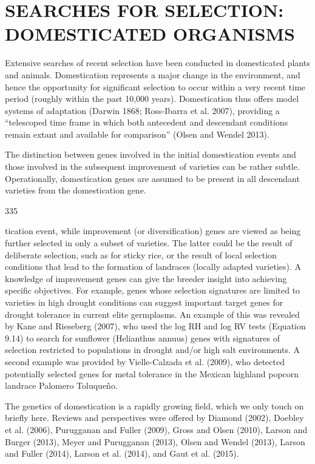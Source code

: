 \documentclass{article}
\begin{document}
\section{SEARCHES FOR SELECTION: DOMESTICATED ORGANISMS}
Extensive searches of recent selection have been conducted in domesticated plants and animals. Domestication represents a major change in the environment, and hence the opportunity for significant selection to occur within a very recent time period (roughly within the past 10,000 years). Domestication thus offers model systems of adaptation (Darwin 1868; Ross-Ibarra et al. 2007), providing a “telescoped time frame in which both antecedent and descendant conditions remain extant and available for comparison” (Olsen and Wendel 2013).

The distinction between genes involved in the initial domestication events and those involved in the subsequent improvement of varieties can be rather subtle. Operationally, domestication genes are assumed to be present in all descendant varieties from the domestication gene.

335

tication event, while improvement (or diversification) genes are viewed as being further selected in only a subset of varieties. The latter could be the result of deliberate selection, such as for sticky rice, or the result of local selection conditions that lead to the formation of landraces (locally adapted varieties). A knowledge of improvement genes can give the breeder insight into achieving specific objectives. For example, genes whose selection signatures are limited to varieties in high drought conditions can suggest important target genes for drought tolerance in current elite germplasms. An example of this was revealed by Kane and Rieseberg (2007), who used the log RH and log RV tests (Equation 9.14) to search for sunflower (Helianthus annuus) genes with signatures of selection restricted to populations in drought and/or high salt environments. A second example was provided by Vielle-Calzada et al. (2009), who detected potentially selected genes for metal tolerance in the Mexican highland popcorn landrace Palomero Toluqueño.

The genetics of domestication is a rapidly growing field, which we only touch on briefly here. Reviews and perspectives were offered by Diamond (2002), Doebley et al. (2006), Purugganan and Fuller (2009), Gross and Olsen (2010), Larson and Burger (2013), Meyer and Purugganan (2013), Olsen and Wendel (2013), Larson and Fuller (2014), Larson et al. (2014), and Gaut et al. (2015).
\end{document}
